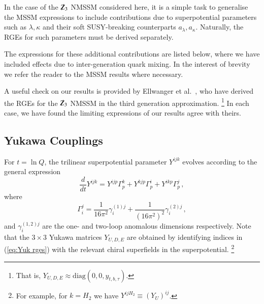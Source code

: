 \documentclass[final,3p,times,pdflatex]{elsarticle}
\newcommand{\Zv}{{\mbox{$\slashed{Z}_{3}$}}} %
\newcommand{\dt}{\frac{d}{dt}}
\begin{document}
In the case of the $\Zv$ NMSSM considered here, it is a simple task to generalise the MSSM expressions \cite{MV94} to include contributions due to superpotential parameters such as $\lambda,\kappa$ and their soft SUSY-breaking counterparts $a_\lambda,a_\kappa$.  Naturally, the RGEs for such parameters must be derived separately.  

The expressions for these additional contributions are listed below, where we have included effects due to inter-generation quark mixing.  In the interest of brevity we refer the reader to the MSSM results \cite{MV94} where necessary. 

A useful check on our results is provided by Ellwanger et al.\ \cite{Ellwanger:2009dp}, who have derived the RGEs for the $\Zv$ NMSSM in the third generation approximation.%
\footnote{That is, $Y_{U,D,E} \approx \mathrm{diag}(0,0,y_{t,b,\tau})$.}
  In each case, we have found the limiting expressions of our results agree with theirs.

\subsection{Yukawa Couplings}
For $t = \ln Q$, the trilinear superpotential parameter $Y^{ijk}$ evolves 
according to the general expression \cite{MV94}
%
\begin{equation}
\dt Y^{ijk} = Y^{ijp}\Gamma_p^k + Y^{kjp}\Gamma_p^i + Y^{ikp}\Gamma_p^j\,,
\label{eq:Yuk rges}
\end{equation}
%
where 
%
\begin{equation}
\Gamma_i^j = \frac{1}{16\pi^2}\gamma_i^{(1)j} 
+ \frac{1}{(16\pi^2)^2}\gamma_{i}^{(2)j}\,, 
\end{equation}
%
and $\gamma^{(1,2)j}_i$ are the one- and two-loop anomalous dimensions 
respectively.  Note that the $3\times 3$ Yukawa matrices $Y_{U,D,E}$ are 
obtained by identifying indices in (\ref{eq:Yuk rges}) with the relevant chiral superfields in the superpotential.%
\footnote{For example, for $k=H_2$ we have $Y^{ijH_2}\equiv (Y_U)^{ij}$.}  
\end{document}
